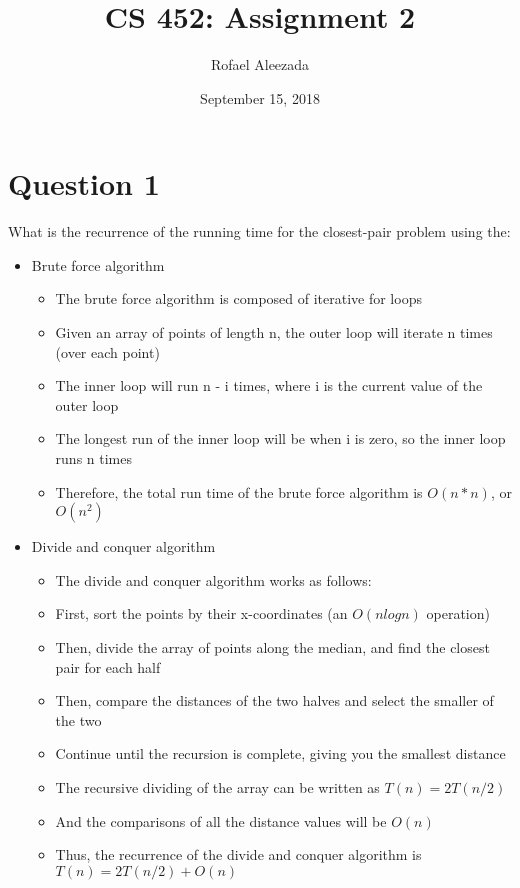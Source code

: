 \documentclass{article}
\title{CS 452: Assignment 2}
\date{September 15, 2018}
\author{Rofael Aleezada}
\begin{document}
    \maketitle
    
    \section{Question 1}
    What is the recurrence of the running time for the closest-pair problem using the:
    	\begin{itemize}
    		\item Brute force algorithm
    			\begin{itemize}
    				\item The brute force algorithm is composed of iterative for loops
    				\item Given an array of points of length n, the outer loop will iterate n times (over each point)
    				\item The inner loop will run n - i times, where i is the current value of the outer loop
    				\item The longest run of the inner loop will be when i is zero, so the inner loop runs n times
    				\item Therefore, the total run time of the brute force algorithm is $O(n*n)$, or $O(n^2)$
    			 \end{itemize}
    		\item Divide and conquer algorithm
    			\begin{itemize}
    				\item The divide and conquer algorithm works as follows:
    				\item First, sort the points by their x-coordinates (an $O(nlogn)$ operation)
    				\item Then, divide the array of points along the median, and find the closest pair for each half
    				\item Then, compare the distances of the two halves and select the smaller of the two 
    				\item Continue until the recursion is complete, giving you the smallest distance
    				\item The recursive dividing of the array can be written as $T(n) = 2T(n/2)$
    				\item And the comparisons of all the distance values will be $O(n)$    			
    				\item Thus, the recurrence of the divide and conquer algorithm is $T(n) = 2T(n/2) + O(n)$
    			\end{itemize}
    	\end{itemize}
    
\end{document}
